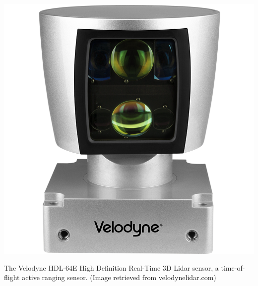 \begin{marginfigure}
\centering
\includegraphics[scale=0.8]{tex/figs/ch07_figs/Velodyne_64e.png}
\caption{The Velodyne HDL-64E High Definition Real-Time 3D Lidar sensor, a time-of-flight active ranging sensor. (Image retrieved from velodynelidar.com)}
\label{fig:active_range}
\end{marginfigure}

